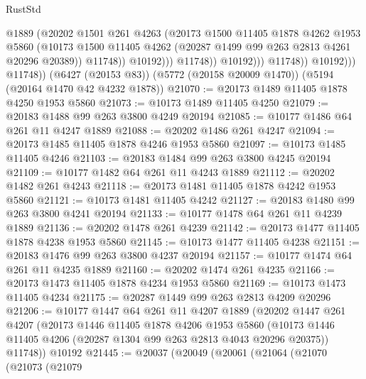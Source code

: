 \begin{lexlean}{RustStd}
\begin{coremodule}
{\begin{coremodule}
{{{{{{{{{{{{{{{{{{{{{{{{{{{{{                                  @1889
                                  (@20202
                                    @1501
                                    @261
                                    @4263
                                    (@20173
                                      @1500
                                      @11405
                                      @1878
                                      @4262
                                      @1953
                                      @5860
                                      (@10173
                                        @1500
                                        @11405
                                        @4262
                                        (@20287 @1499 @99 @263 @2813 @4261 @20296 @20389))
                                      @11748))
                                  @10192)))
                            @11748))
                        @10192)))
                  @11748))
              @10192)))
        @11748))
    (@6427 (@20153 @83))
    (@5772 (@20158 @20009 @1470))
    (@5194 (@20164 @1470 @42 @4232 @1878))
@21070 := @20173 @1489 @11405 @1878 @4250 @1953 @5860
@21073 := @10173 @1489 @11405 @4250
@21079 := @20183 @1488 @99 @263 @3800 @4249 @20194
@21085 := @10177 @1486 @64 @261 @11 @4247 @1889
@21088 := @20202 @1486 @261 @4247
@21094 := @20173 @1485 @11405 @1878 @4246 @1953 @5860
@21097 := @10173 @1485 @11405 @4246
@21103 := @20183 @1484 @99 @263 @3800 @4245 @20194
@21109 := @10177 @1482 @64 @261 @11 @4243 @1889
@21112 := @20202 @1482 @261 @4243
@21118 := @20173 @1481 @11405 @1878 @4242 @1953 @5860
@21121 := @10173 @1481 @11405 @4242
@21127 := @20183 @1480 @99 @263 @3800 @4241 @20194
@21133 := @10177 @1478 @64 @261 @11 @4239 @1889
@21136 := @20202 @1478 @261 @4239
@21142 := @20173 @1477 @11405 @1878 @4238 @1953 @5860
@21145 := @10173 @1477 @11405 @4238
@21151 := @20183 @1476 @99 @263 @3800 @4237 @20194
@21157 := @10177 @1474 @64 @261 @11 @4235 @1889
@21160 := @20202 @1474 @261 @4235
@21166 := @20173 @1473 @11405 @1878 @4234 @1953 @5860
@21169 := @10173 @1473 @11405 @4234
@21175 := @20287 @1449 @99 @263 @2813 @4209 @20296
@21206 := @10177
    @1447
    @64
    @261
    @11
    @4207
    @1889
    (@20202
      @1447
      @261
      @4207
      (@20173
        @1446
        @11405
        @1878
        @4206
        @1953
        @5860
        (@10173 @1446 @11405 @4206 (@20287 @1304 @99 @263 @2813 @4043 @20296 @20375))
        @11748))
    @10192
@21445 := @20037
    (@20049
      (@20061
        (@21064
          (@21070
            (@21073
              (@21079
}}}}}}}}}}}}}}}}}}}}}}}}}}}}}
\end{coremodule}}
\end{coremodule}
\end{lexlean}
